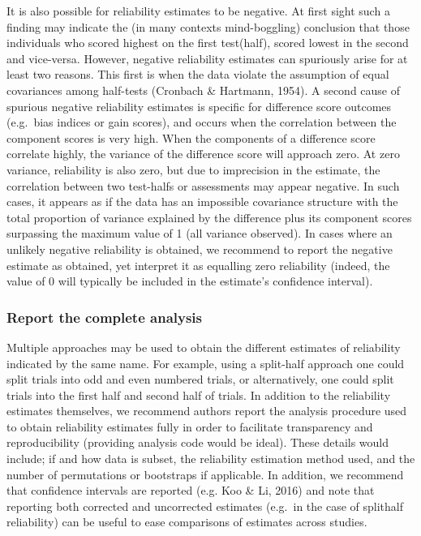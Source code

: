\documentclass[english,,man,floatsintext]{apa6}
\begin{document}
It is also possible for reliability estimates to be negative. At first sight such a finding may indicate the (in many contexts mind-boggling) conclusion that those individuals who scored highest on the first test(half), scored lowest in the second and vice-versa. However, negative reliability estimates can spuriously arise for at least two reasons. This first is when the data violate the assumption of equal covariances among half-tests (Cronbach \& Hartmann, 1954). A second cause of spurious negative reliability estimates is specific for difference score outcomes (e.g.~bias indices or gain scores), and occurs when the correlation between the component scores is very high. When the components of a difference score correlate highly, the variance of the difference score will approach zero. At zero variance, reliability is also zero, but due to imprecision in the estimate, the correlation between two test-halfs or assessments may appear negative. In such cases, it appears as if the data has an impossible covariance structure with the total proportion of variance explained by the difference plus its component scores surpassing the maximum value of 1 (all variance observed). In cases where an unlikely negative reliability is obtained, we recommend to report the negative estimate as obtained, yet interpret it as equalling zero reliability (indeed, the value of 0 will typically be included in the estimate's confidence interval).

\hypertarget{report-the-complete-analysis}{%
\subsubsection{Report the complete analysis}\label{report-the-complete-analysis}}

Multiple approaches may be used to obtain the different estimates of reliability indicated by the same name. For example, using a split-half approach one could split trials into odd and even numbered trials, or alternatively, one could split trials into the first half and second half of trials. In addition to the reliability estimates themselves, we recommend authors report the analysis procedure used to obtain reliability estimates fully in order to facilitate transparency and reproducibility (providing analysis code would be ideal). These details would include; if and how data is subset, the reliability estimation method used, and the number of permutations or bootstraps if applicable. In addition, we recommend that confidence intervals are reported (e.g. Koo \& Li, 2016) and note that reporting both corrected and uncorrected estimates (e.g.~in the case of splithalf reliability) can be useful to ease comparisons of estimates across studies.
\end{document}
